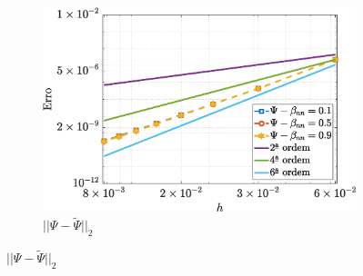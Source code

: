 \begin{figure}[H]
\begin{subfigure}[b]{.47\textwidth}
        \includegraphics[width=\textwidth]{figures/Case12/Giesekus/Errors/NormErr_2nd_Re_100_Wi_1_epsilon_0_xi_0_alphaG_0.1_Dt_1e-06_at_0.05_tipsim_1_MMS_12_Psi.eps}
        \caption{$||\Psi - \widetilde{\Psi}||_{2}$}
        \label{error_psi_2nd_Case1_oldorydbgiesekus_alphaG_0.5}
    \end{subfigure}
    \fdadospesquisa
\end{figure}

